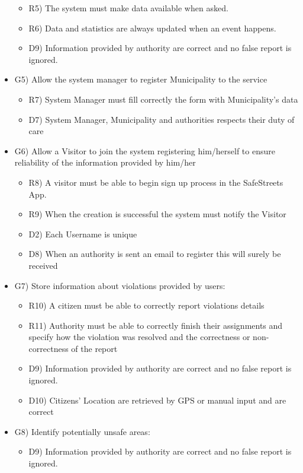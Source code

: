 \begin{itemize}
\begin{itemize}
 \item R5) The system must make data available when asked.
 \item R6) Data and statistics are always updated when an event happens.  
 \item D9) Information provided by authority are correct and no false report is ignored.
\end{itemize}
\item G5) Allow the system manager to register Municipality to the service
\begin{itemize}
\item R7) System Manager must fill correctly the form with Municipality’s data
\item D7) System Manager, Municipality and authorities respects their duty of care
\end{itemize}
\item G6) Allow a Visitor to join the system registering him/herself to ensure reliability of the information provided by him/her
\begin{itemize}
 \item R8) A visitor must be able to begin sign up process in the SafeStreets App.
 \item R9) When the creation is successful the system must notify the Visitor 
 \item D2) Each Username is unique
 \item D8) When an authority is sent an email to register this will surely be received
\end{itemize}
\item G7) Store information about violations provided by users:
\begin{itemize}
 \item R10) A citizen must be able to correctly report violations details
 \item R11) Authority must be able to correctly finish their assignments and specify how the  violation was resolved and the correctness or non-correctness of the report
 \item D9) Information provided by authority are correct and no false report is ignored.
 \item D10) Citizens’ Location are retrieved by GPS or manual input and are correct
\end{itemize}
\item G8) Identify potentially unsafe areas:
\begin{itemize}
\item D9) Information provided by authority are correct and no false report is ignored.

\end{itemize}
\end{itemize}
